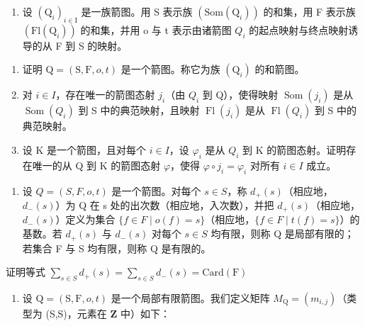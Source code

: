 \exercisegroup

\begin{enumerate}
\def\labelenumi{\arabic{enumi})}
\tightlist
\item
  设 \((\mathrm{Q}_{i})_{i\in\mathrm{I}}\) 是一族箭图。用 S 表示族 \((\mathrm{Som}(\mathrm{Q}_{i}))\) 的和集，用 F 表示族 \((\mathrm{Fl}(\mathrm{Q}_{i}))\) 的和集，并用 o 与 t 表示由诸箭图 \(Q_{i}\) 的起点映射与终点映射诱导的从 F 到 S 的映射。
\end{enumerate}

\begin{enumerate}
\def\labelenumi{\alph{enumi})}
\item
  证明 \(\mathrm{Q} = (\mathrm{S}, \mathrm{F}, o, t)\) 是一个箭图。称它为族 \((\mathrm{Q}_{i})\) 的和箭图。
\item
  对 \(i \in I\)，存在唯一的箭图态射 \(j_{i}\)（由 \(Q_{i}\) 到 Q），使得映射 \(\operatorname{Som}(j_{i})\) 是从 \(\operatorname{Som}(Q_{i})\) 到 S 中的典范映射，且映射 \(\operatorname{Fl}(j_{i})\) 是从 \(\operatorname{Fl}(Q_{i})\) 到 S 中的典范映射。
\item
  设 K 是一个箭图，且对每个 \(i \in I\)，设 \(\varphi_{i}\) 是从 \(Q_{i}\) 到 K 的箭图态射。证明存在唯一的从 Q 到 K 的箭图态射 \(\varphi\)，使得 \(\varphi \circ j_{i} = \varphi_{i}\) 对所有 \(i \in I\) 成立。
\end{enumerate}

\begin{enumerate}
\def\labelenumi{\arabic{enumi})}
\setcounter{enumi}{1}
\tightlist
\item
  设 \(Q = (S, F, o, t)\) 是一个箭图。对每个 \(s \in S\)，称 \(d_{+}(s)\)（相应地，\(d_{-}(s)\)）为 Q 在 s 处的出次数（相应地，入次数），并把 \(d_{+}(s)\)（相应地，\(d_{-}(s)\)）定义为集合 \(\{f \in F \mid o(f) = s\}\)（相应地，\(\{f \in F \mid t(f) = s\}\)）的基数。若 \(d_{+}(s)\) 与 \(d_{-}(s)\) 对每个 \(s \in S\) 均有限，则称 Q 是局部有限的；若集合 F 与 S 均有限，则称 Q 是有限的。
\end{enumerate}

证明等式 \(\sum_{s\in S}d_{+}(s) = \sum_{s\in S}d_{-}(s) = \mathrm{Card}(\mathrm{F})\)

\begin{enumerate}
\def\labelenumi{\arabic{enumi})}
\setcounter{enumi}{2}
\tightlist
\item
  设 \(\mathrm{Q} = (\mathrm{S},\mathrm{F},o,t)\) 是一个局部有限箭图。我们定义矩阵 \(M_{\mathrm{Q}} = (m_{i,j})\)（类型为 (S,S)，元素在 \(\mathbf{Z}\) 中）如下：
\end{enumerate}

